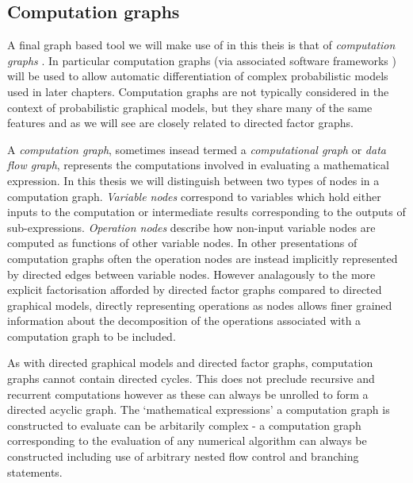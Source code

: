 
\subsection{Computation graphs}

A final graph based tool we will make use of in this theis is that of \emph{computation graphs} \citep{bauer1974computational}. In particular computation graphs (via associated software frameworks \citep{theano2016theano}) will be used to allow automatic differentiation of complex probabilistic models used in later chapters. Computation graphs are not typically considered in the context of probabilistic graphical models, but they share many of the same features and as we will see are closely related to directed factor graphs.

A \emph{computation graph}, sometimes insead termed a \emph{computational graph} or \emph{data flow graph}, represents the computations involved in evaluating a mathematical expression. In this thesis we will distinguish between two types of nodes in a computation graph. \emph{Variable nodes} correspond to variables which hold either inputs to the computation or intermediate results corresponding to the outputs of sub-expressions. \emph{Operation nodes} describe how non-input variable nodes are computed as functions of other variable nodes. In other presentations of computation graphs often the operation nodes are instead implicitly represented by directed edges between variable nodes. However analagously to the more explicit factorisation afforded by directed factor graphs compared to directed graphical models, directly representing operations as nodes allows finer grained information about the decomposition of the operations associated with a computation graph to be included.

As with directed graphical models and directed factor graphs, computation graphs cannot contain directed cycles. This does not preclude recursive and recurrent computations however as these can always be unrolled to form a directed acyclic graph. The `mathematical expressions' a computation graph is constructed to evaluate can be arbitarily complex - a computation graph corresponding to the evaluation of any numerical algorithm can always be constructed including use of arbitrary nested flow control and branching statements.

